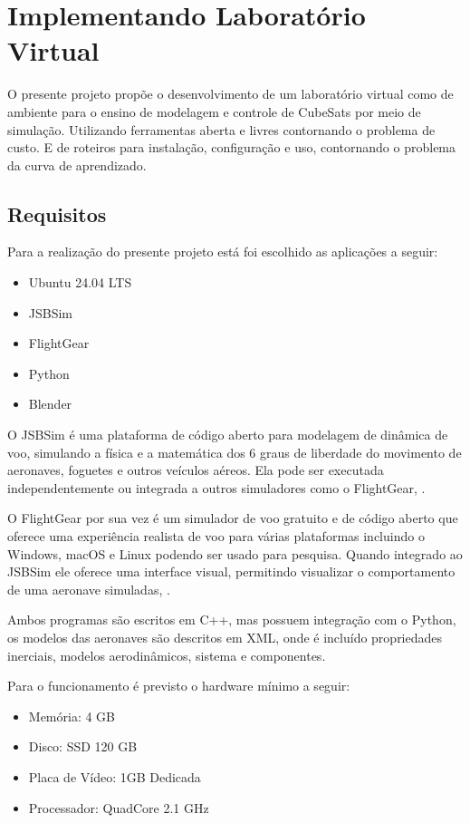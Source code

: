 \chapter{Implementando Laboratório Virtual}\label{cap:proposta}

O presente projeto propõe o desenvolvimento de um laboratório virtual como de ambiente para o ensino de modelagem e controle de CubeSats por meio de simulação. Utilizando ferramentas aberta e livres contornando o problema de custo. E de roteiros para instalação, configuração e uso, contornando o problema da curva de aprendizado.

\section{Requisitos}\label{Requisitos}

Para a realização do presente projeto está foi escolhido as aplicações a seguir:

\begin{itemize}
    \item Ubuntu 24.04 LTS
    \item JSBSim
    \item FlightGear
    \item Python
    \item Blender
\end{itemize}

O JSBSim é uma plataforma de código aberto para modelagem de dinâmica de voo, simulando a física e a matemática dos 6 graus de liberdade do movimento de aeronaves, foguetes e outros veículos aéreos. Ela pode ser executada independentemente ou integrada a outros simuladores como o FlightGear, .

O FlightGear por sua vez é um simulador de voo gratuito e de código aberto que oferece uma experiência realista de voo para várias plataformas incluindo o Windows, macOS e Linux podendo ser usado para pesquisa. Quando integrado ao JSBSim ele oferece uma interface visual, permitindo visualizar o comportamento de uma aeronave simuladas, .

Ambos programas são escritos em C++, mas possuem integração com o Python, os modelos das aeronaves são descritos em XML, onde é incluído propriedades inerciais, modelos aerodinâmicos, sistema e componentes.

Para o funcionamento é previsto o hardware mínimo a seguir:

\begin{itemize}
    \item Memória: 4 GB
    \item Disco: SSD 120 GB
    \item Placa de Vídeo: 1GB Dedicada
    \item Processador: QuadCore 2.1 GHz
\end{itemize}

